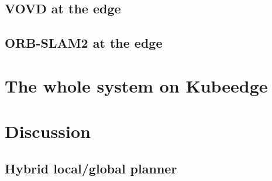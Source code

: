 \subsection{VOVD at the edge}


\subsection{ORB-SLAM2 at the edge}

\section{The whole system on Kubeedge}



\section{Discussion}

















































\subsection{Hybrid local/global planner}



